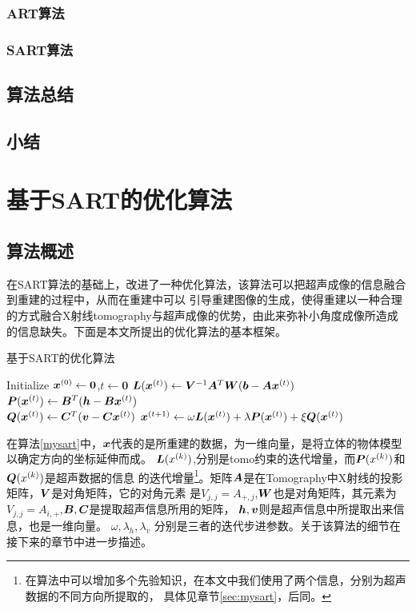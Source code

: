 \subsection{ART算法}
\subsection{SART算法}
\section{算法总结}
\section{小结}



\chapter{基于SART的优化算法}
\section{算法概述}
在SART算法的基础上，改进了一种优化算法，该算法可以把超声成像的信息融合到重建的过程中，从而在重建中可以
引导重建图像的生成，使得重建以一种合理的方式融合X射线tomography与超声成像的优势，由此来弥补小角度成像所造成
的信息缺失。下面是本文所提出的优化算法的基本框架。
\begin{algo}\label{mysart}
基于SART的优化算法
\begin{algorithmic}[1]
\STATE
Initialize $\bm{ x}^{(0)} \leftarrow \bm{0}$,$t\leftarrow \bm{0}$
\REPEAT
\STATE
$\bm{L}(\bm{ x}^{(t)}) \leftarrow  \bm{V}^{-1}\bm{A}^T\bm{W}(\bm{b}-\bm{A}\bm{ x}^{(t)})$ \\
$\bm{P}(\bm{ x}^{(t)}) \leftarrow \bm{B}^{T}(\bm{h}-\bm{B}\bm{ x}^{(t)})$ \\    %
$\bm{Q}(\bm{ x}^{(t)}) \leftarrow \bm{C}^{T}(\bm{v}-\bm{C}\bm{ x}^{(t)})$         %
\STATE
$\bm{ x}^{(t+1)}\leftarrow \omega\bm{L}(\bm{ x}^{(t)}) + \lambda\bm{P}(\bm{ x}^{(t)}) + \xi\bm{Q}(\bm{ x}^{(t)})    $
\end{algorithmic}
\end{algo}

在算法\ref{mysart}中，$\bm{ x}$代表的是所重建的数据，为一维向量，是将立体的物体模型以确定方向的坐标延伸而成。
$\bm{L}(x^{(k)})$,分别是tomo约束的迭代增量，而$\bm{P}(x^{(k)})$和$ \bm{Q}(x^{(k)})$是超声数据的信息
的迭代增量\footnote{在算法中可以增加多个先验知识，在本文中我们使用了两个信息，分别为超声数据的不同方向所提取的，
具体见章节\ref{sec:mysart}，后同。}。矩阵$\bm{A}$是在Tomography中X射线的投影矩阵，$\bm{V}$是对角矩阵，它的对角元素
是$V_{j,j}=A_{+,j}$,$\bm{W}$也是对角矩阵，其元素为$V_{j,j}=A_{i,+}$,$\bm{B},\bm{C}$是提取超声信息所用的矩阵，
$\bm{h},\bm{v}$则是超声信息中所提取出来信息，也是一维向量。
$\omega,\lambda_h,\lambda_v$
分别是三者的迭代步进参数。关于该算法的细节在接下来的章节中进一步描述。



